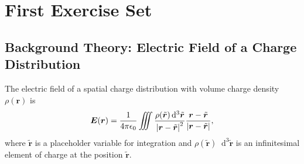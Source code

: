 \documentclass[11pt, a4paper]{article}
\newcommand{\diff}{\mathop{}\!\mathrm{d}} %
\renewcommand{\vec}[1]{\bm{#1}} %
\newcommand{\tvec}[1]{\tilde{\vec{#1}}} %
\renewcommand{\r}{\vec{r}}
\newcommand{\ee}{\epsilon_{0}}  %
\begin{document}
\newpage

\pagestyle{empty}  %
\tableofcontents

\newpage

\pagestyle{fancy}  %

\section{First Exercise Set}

\subsection{Background Theory: Electric Field of a Charge Distribution}
The electric field of a spatial charge distribution with volume charge density $ \rho(\r) $ is
\begin{equation*}
	\vec{E}(\vec{r}) = \frac{1}{4\pi \ee}\iiint \frac{\rho(\tvec{r}) \diff^{3}\tvec{r} }{\abs{\vec{r} - \tvec{r}}^{2}} \frac{\vec{r} - \tvec{r}}{\abs{\vec{r} - \tvec{r}}},
\end{equation*}
where $ \tvec{r} $ is a placeholder variable for integration and $ \rho(\tvec{r}) \diff^{3}\tvec{r} $ is an infinitesimal element of charge at the position $ \tvec{r} $.
\end{document}
